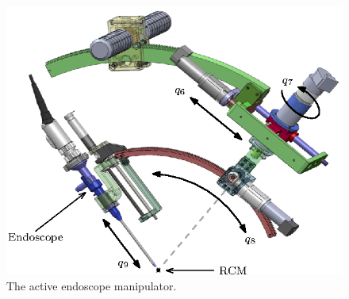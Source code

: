 \documentclass[journal,twoside]{IEEEtran}
\theoremstyle{definition}
\begin{document}

\begin{figure}[t]
\centering
\includegraphics[scale = 1]{fig5}
\caption{The active endoscope manipulator.}
\label{fig:active_manipulator}
\end{figure}
\end{document}

